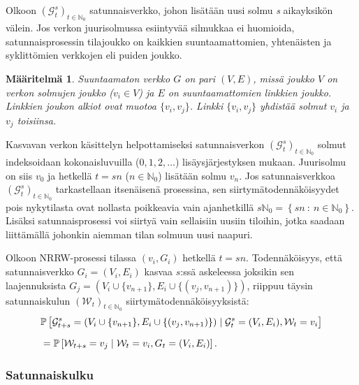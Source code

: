 \documentclass[finnish, 12pt, a4paper, sci, utf8, pdfa]{aaltothesis}
\newcommand{\N}{\mathbb{N}}
\newcommand{\Grandom}{\mathcal{G}}
\newcommand{\Wrandom}{\mathcal{W}}
\newcommand*{\prob}{\mathbb{P}}
\newtheorem{definition}{Määritelmä}
\begin{document}
Olkoon \( (\Grandom_{t}^{s})_{t \in \N_{0}} \) satunnaisverkko, johon lisätään uusi solmu \textit{s} aikayksikön välein. Jos verkon juurisolmussa esiintyvää silmukkaa ei huomioida, satunnaisprosessin tilajoukko on kaikkien suuntaamattomien, yhtenäisten ja syklittömien verkkojen eli puiden joukko.
\begin{definition}
   \label{definition:verkko}
Suuntaamaton verkko $ G $ on pari $ (V, E) $, missä joukko $ V $ on verkon solmujen joukko (\( v_{i} \in V \)) ja $ E $ on suuntaamattomien linkkien joukko. Linkkien joukon alkiot ovat muotoa \( \{ v_{i}, v_{j} \} \). Linkki \( \{ v_{i}, v_{j} \} \) yhdistää solmut \( v_{i} \) ja \( v_{j} \) toisiinsa. 
\end{definition}
Kasvavan verkon käsittelyn helpottamiseksi satunnaisverkon \( (\Grandom_{t}^{s})_{t \in \N_{0}} \) solmut indeksoidaan kokonaisluvuilla (\( 0, 1, 2, \ldots \)) lisäysjärjestyksen mukaan. Juurisolmu on siis \( v_{0} \) ja hetkellä \( t = sn \) (\( n \in \N_{0} \)) lisätään solmu \( v_{n} \). Jos satunnaisverkkoa \( (\Grandom_{t}^{s})_{t \in \N_{0}} \) tarkastellaan itsenäisenä prosessina, sen siirtymätodennäköisyydet pois nykytilasta ovat nollasta poikkeavia vain ajanhetkillä \( s\N_{0} = \left\{ sn \: : \: n \in \N_{0} \right\} \). Lisäksi satunnaisprosessi voi
siirtyä vain sellaisiin uusiin tiloihin, jotka saadaan liittämällä johonkin aiemman tilan solmuun uusi naapuri.

Olkoon NRRW-prosessi tilassa $ (v_{i}, G_{i}) $ hetkellä $ t = sn $. Todennäköisyys, että satunnaisverkko $ G_{i} = (V_{i}, E_{i}) $ kasvaa $s$:ssä askeleessa joksikin sen laajennuksista 
$ G_{j} = (V_{i} \cup \{ v_{n + 1} \}, E_{i} \cup \{ (v_{j}, v_{n + 1}) \}) $, riippuu täysin satunnaiskulun \( (\Wrandom_{t})_{t \in \N_{0}} \) siirtymätodennäköisyyksistä:
\begin{equation}
   \setlength{\jot}{10pt}
   \begin{aligned}
   & \prob \left[ \Grandom_{t+s}^{s} = (V_{i} \cup \{ v_{n + 1} \}, E_{i} \cup \{ (v_{j}, v_{n + 1}) \}) \mid \Grandom_{t}^{s} = (V_{i}, E_{i}), \Wrandom_{t} = v_{i} \right] \\
   &= \prob \left[ \Wrandom_{t+s} = v_{j} \mid \Wrandom_{t} = v_{i}, G_{t} = (V_{i}, E_{i}) \right].
   \end{aligned}
\end{equation}

\subsubsection{Satunnaiskulku}
\end{document}

